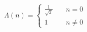 \documentclass[preview]{standalone}
\begin{document}
\begin{align*}
\Lambda(n) = \left\{\begin{array}{ll} \frac{1}{\sqrt{2}} & \quad n = 0 \\ 1 & \quad n \neq 0 \end{array}\right.
\end{align*}
\end{document}
